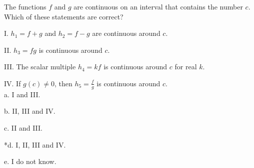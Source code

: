 
The functions \(f\) and \(g\) are continuous on an interval that contains the
number \(c\). Which of these statements are correct?

I. \(h_1=f+g\) and \(h_2=f-g\) are continuous around \(c\).

II. \(h_3=fg\) is continuous around \(c\).

III. The scalar multiple \(h_4=kf\) is continuous around \(c\) for real \(k\).

IV. If \(g(c) \neq 0\), then \(h_5=\frac{f}{g}\) is continuous around \(c\).\\

a. I and III.

b. II, III and IV.

c. II and III.

*d. I, II, III and IV.

e. I do not know.\\
